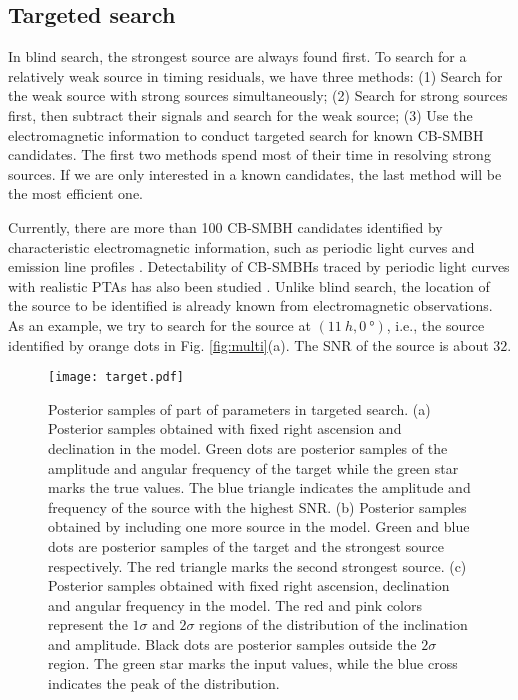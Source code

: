 \documentclass[times,tight]{aastex631}
\begin{document}
\subsection{Targeted search}
In blind search, the strongest source are always found first.
To search for a relatively weak source in timing residuals, we have three methods:
(1) Search for the weak source with strong sources simultaneously;
(2) Search for strong sources first, then subtract their signals and search for the weak source;
(3) Use the electromagnetic information to conduct targeted search for known CB-SMBH candidates.
The first two methods spend most of their time in resolving strong sources. If we are only interested in a known candidates, the last method will be the most efficient one.

Currently, there are more than 100 CB-SMBH candidates identified by characteristic electromagnetic information, such as periodic light curves \citep[e.g.][]{graham2015, charisi2016} and emission line profiles \citep[e.g.][]{bon2012,eracleous2012,li2016,li2019}.
Detectability of CB-SMBHs traced by periodic light curves with realistic PTAs has also been studied \citep{xin2021}.
Unlike blind search, the location of the source to be identified is already known from electromagnetic observations.
As an example, we try to search for the source at $(\SI{11}{h}, \SI{0}{\degree})$, i.e., the source identified by orange dots in Fig. \ref{fig:multi}(a).
The SNR of the source is about $32$.

\begin{figure}
    \centering
    \texttt{[image: target.pdf]}
    \caption{Posterior samples of part of parameters in targeted search.
    (a) Posterior samples obtained with fixed right ascension and declination in the model.
    Green dots are posterior samples of the amplitude and angular frequency of the target while the green star marks the true values.
    The blue triangle indicates the amplitude and frequency of the source with the highest SNR.
    (b) Posterior samples obtained by including one more source in the model.
    Green and blue dots are posterior samples of the target and the strongest source respectively.
    The red triangle marks the second strongest source.
    (c)  Posterior samples obtained with fixed right ascension, declination and angular frequency in the model.
    The red and pink colors represent the $1\sigma$ and $2\sigma$ regions of the distribution of the inclination and amplitude.
    Black dots are posterior samples outside the $2\sigma$ region.
    The green star marks the input values, while the blue cross indicates the peak of the distribution.
    \label{fig:target}}
\end{figure}
\end{document}
